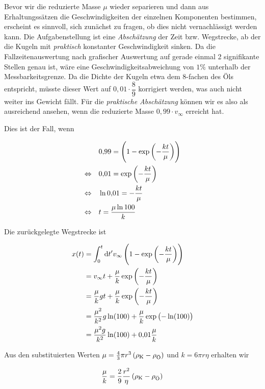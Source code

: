 \documentclass[a4paper,german,12pt,smallheadings]{scrartcl}
\begin{document}
Bevor wir die reduzierte Masse $\mu$ wieder separieren und dann aus
Erhaltungssätzen die Geschwindigkeiten der einzelnen Komponenten bestimmen,
erscheint es sinnvoll, sich zunächst zu fragen, ob dies nicht vernachlässigt
werden kann. Die Aufgabenstellung ist eine \textit{Abschätzung} der Zeit bzw.
Wegstrecke, ab der die Kugeln mit \textit{praktisch} konstanter Geschwindigkeit
sinken. Da die Fallzeitenauswertung nach grafischer Auswertung auf gerade
einmal 2 signifikante Stellen genau ist, wäre eine Geschwindigkeitsabweichung
von $1 \%$ unterhalb der Messbarkeitsgrenze. Da die Dichte der Kugeln etwa dem
8-fachen des Öls entspricht, müsste dieser Wert auf $0{,}01 \cdot \dfrac{8}{9}$
korrigiert werden, was auch nicht weiter ins Gewicht fällt. Für die
\textit{praktische Abschätzung} können wir es also als ausreichend ansehen,
wenn die reduzierte Masse $0{,}99 \cdot v_\infty$ erreicht hat.

Dies ist der Fall, wenn

\begin{align*}
  &0{,}99 = \del{1 - \exp\del{-\frac{k t}{\mu}}} \\
  \Leftrightarrow \quad &
  0{,}01 = \exp\del{-\frac{k t}{\mu}} \\
  \Leftrightarrow \quad &
  \ln{0{,}01} = -\frac{k t}{\mu} \\
  \Leftrightarrow \quad &
  t = \frac{\mu \ln{100}}{k}\\
\end{align*}

Die zurückgelegte Wegstrecke ist

\begin{align}
  x(t) &= \int_0^t \dif t' v_{\infty} \del{1 - \exp\del{-\frac{k t}{\mu}}} \\
  &= v_\infty t + \frac{\mu}{k} \exp\del{-\frac{k t}{\mu}} \\
  &= \frac{\mu}{k} g t + \frac{\mu}{k} \exp\del{-\frac{k t}{\mu}} \\
  &= \frac{\mu^2}{k^2} g \ln(100) + \frac{\mu}{k} \exp\del{-\ln(100)} \\
  &= \frac{\mu^2g}{k^2} \ln(100) + 0{,}01 \frac{\mu}{k}
\end{align}

Aus den substituierten Werten $\mu = \frac{4}{3} \pi r^3 \del{\rho_\text{K} -
\rho_\text{Ö}}$ und $k = 6 \pi r \eta$ erhalten wir

\begin{equation}
  \frac{\mu}{k} = \frac{2}{9} \frac{r^2}{\eta} \del{ \rho_\text{K} - \rho_\text{Ö} }
\end{equation}
\end{document}
